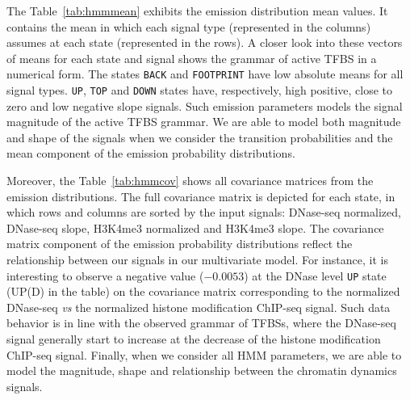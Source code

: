 The Table~\ref{tab:hmmmean} exhibits the emission distribution mean values. It contains the mean in which each signal type (represented in the columns) assumes at each state (represented in the rows). A closer look into these vectors of means for each state and signal shows the grammar of active TFBS in a numerical form. The states {\tt BACK} and {\tt FOOTPRINT} have low absolute means for all signal types. {\tt UP}, {\tt TOP} and {\tt DOWN} states have, respectively, high positive, close to zero and low negative slope signals. Such emission parameters models the signal magnitude of the active TFBS grammar. We are able to model both magnitude and shape of the signals when we consider the transition probabilities and the mean component of the emission probability distributions.

Moreover, the Table~\ref{tab:hmmcov} shows all covariance matrices from the emission distributions. The full covariance matrix is depicted for each state, in which rows and columns are sorted by the input signals: DNase-seq normalized, DNase-seq slope, H3K4me3 normalized and H3K4me3 slope. The covariance matrix component of the emission probability distributions reflect the relationship between our signals in our multivariate model. For instance, it is interesting to observe a negative value ($-0.0053$) at the DNase level {\tt UP} state (UP(D) in the table) on the covariance matrix corresponding to the normalized DNase-seq \emph{vs} the normalized histone modification ChIP-seq signal. Such data behavior is in line with the observed grammar of TFBSs, where the DNase-seq signal generally start to increase at the decrease of the histone modification ChIP-seq signal. Finally, when we consider all HMM parameters, we are able to model the magnitude, shape and relationship between the chromatin dynamics signals.


